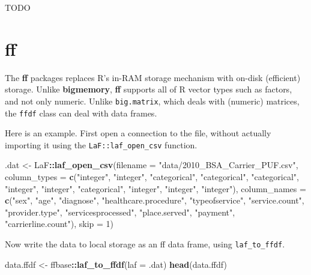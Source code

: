 \documentclass[]{book}
\newenvironment{Shaded}{\begin{snugshade}}{\end{snugshade}}
\newcommand{\DataTypeTok}[1]{\textcolor[rgb]{0.13,0.29,0.53}{#1}}
\newcommand{\DecValTok}[1]{\textcolor[rgb]{0.00,0.00,0.81}{#1}}
\newcommand{\KeywordTok}[1]{\textcolor[rgb]{0.13,0.29,0.53}{\textbf{#1}}}
\newcommand{\NormalTok}[1]{#1}
\newcommand{\OperatorTok}[1]{\textcolor[rgb]{0.81,0.36,0.00}{\textbf{#1}}}
\newcommand{\StringTok}[1]{\textcolor[rgb]{0.31,0.60,0.02}{#1}}
\theoremstyle{definition}
\theoremstyle{definition}
\theoremstyle{definition}
\theoremstyle{remark}
\begin{document}
TODO

\hypertarget{ff}{%
\section{ff}\label{ff}}

The \textbf{ff} packages replaces R's in-RAM storage mechanism with on-disk (efficient) storage.
Unlike \textbf{bigmemory}, \textbf{ff} supports all of R vector types such as factors, and not only numeric.
Unlike \texttt{big.matrix}, which deals with (numeric) matrices, the \texttt{ffdf} class can deal with data frames.

Here is an example.
First open a connection to the file, without actually importing it using the \texttt{LaF::laf\_open\_csv} function.

\begin{Shaded}
\begin{Highlighting}[]
\NormalTok{.dat <-}\StringTok{ }\NormalTok{LaF}\OperatorTok{::}\KeywordTok{laf_open_csv}\NormalTok{(}\DataTypeTok{filename =} \StringTok{"data/2010_BSA_Carrier_PUF.csv"}\NormalTok{,}
                    \DataTypeTok{column_types =} \KeywordTok{c}\NormalTok{(}\StringTok{"integer"}\NormalTok{, }\StringTok{"integer"}\NormalTok{, }\StringTok{"categorical"}\NormalTok{, }\StringTok{"categorical"}\NormalTok{, }\StringTok{"categorical"}\NormalTok{, }\StringTok{"integer"}\NormalTok{, }\StringTok{"integer"}\NormalTok{, }\StringTok{"categorical"}\NormalTok{, }\StringTok{"integer"}\NormalTok{, }\StringTok{"integer"}\NormalTok{, }\StringTok{"integer"}\NormalTok{), }
                    \DataTypeTok{column_names =} \KeywordTok{c}\NormalTok{(}\StringTok{"sex"}\NormalTok{, }\StringTok{"age"}\NormalTok{, }\StringTok{"diagnose"}\NormalTok{, }\StringTok{"healthcare.procedure"}\NormalTok{, }\StringTok{"typeofservice"}\NormalTok{, }\StringTok{"service.count"}\NormalTok{, }\StringTok{"provider.type"}\NormalTok{, }\StringTok{"servicesprocessed"}\NormalTok{, }\StringTok{"place.served"}\NormalTok{, }\StringTok{"payment"}\NormalTok{, }\StringTok{"carrierline.count"}\NormalTok{), }
                    \DataTypeTok{skip =} \DecValTok{1}\NormalTok{)}
\end{Highlighting}
\end{Shaded}

Now write the data to local storage as an ff data frame, using \texttt{laf\_to\_ffdf}.

\begin{Shaded}
\begin{Highlighting}[]
\NormalTok{data.ffdf <-}\StringTok{ }\NormalTok{ffbase}\OperatorTok{::}\KeywordTok{laf_to_ffdf}\NormalTok{(}\DataTypeTok{laf =}\NormalTok{ .dat)}
\KeywordTok{head}\NormalTok{(data.ffdf)}
\end{Highlighting}
\end{Shaded}
\end{document}
